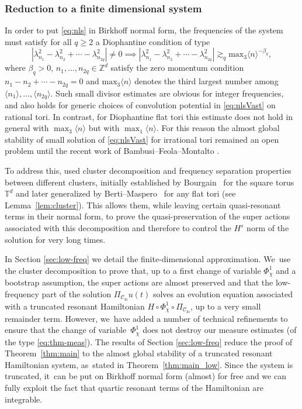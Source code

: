 \documentclass[10pt,a4paper]{amsart}
\theoremstyle{plain}
\theoremstyle{definition}
\DeclareMathOperator{\lo}{lo}
\newcommand{\T}{\mathbb{T}}
\newcommand{\1}{\mathbf{1}}
\newcommand{\Clo}{\mathscr{C}_{\lo}}
\begin{document}
\subsubsection{Reduction to a finite dimensional system}
\label{sub:resonant}

In order to put \eqref{eq:nls} in Birkhoff normal form, the frequencies of the system must satisfy for all $q\geq2$ a Diophantine condition of type
\[
|\lambda_{n_1}^2 -\lambda_{n_2}^2 + \cdots - \lambda_{n_{2q}}^2 | \neq 0 \implies |\lambda_{n_1}^2 -\lambda_{n_2}^2 + \cdots - \lambda_{n_{2q}}^2 | \gtrsim_{q} \mathrm{max}_{3} \langle n \rangle^{-\beta_q},
\]
where $\beta_q>0$, $n_1,\dots,n_{2q}\in \mathbb{Z}^d$ satisfy the zero momentum condition $n_1-n_2 + \cdots -n_{2q}=0$ and $\mathrm{max}_{3} \langle n \rangle$ denotes the third largest number among $\langle n_1 \rangle,\dots, \langle n_{2q} \rangle$. Such small divisor estimates are obvious for integer frequencies, and also holds for generic choices of convolution potential in \eqref{eq:nlsVast} on rational tori. In contrast, for Diophantine flat tori this estimate does not hold in general with $\max_{3}\langle n\rangle$ but with $\max_{1}\langle n\rangle$. For this reason the almost global stability of small solution of \eqref{eq:nlsVast} for irrational tori remained an open problem until the recent work of Bambusi--Feola--Montalto \cite{BFM22}.

To address this, \cite{BFM22} used cluster decomposition and frequency separation properties between different clusters, initially established by Bourgain~\cite{Bou98} for the square torus $\T^d$ and later generalized by Berti--Maspero~\cite{Berti-Maspero-19} for any flat tori (see Lemma~\ref{lem:cluster}). This allows them, while leaving certain quasi-resonant terms in their normal form, to prove the quasi-preservation of the super actions associated with this decomposition and therefore to control the $H^s$ norm of the solution for very long times.

In Section \ref{sec:low-freq} we detail the finite-dimensional approximation. We~use the cluster decomposition to prove that, up to a first change of variable $\Phi_\chi^1$ and a bootstrap assumption, the super actions are almost preserved and that the low-frequency part of the solution $\Pi_{\Clo} u(t) $ solves an evolution equation associated with a truncated resonant Hamiltonian $H \circ \Phi_\chi^1 \circ \Pi_{\Clo}$, up to a very small remainder term. However, we~have added a number of technical refinements to ensure that the change of variable~$\Phi_\chi^1$ does not destroy our measure estimates (of the type \eqref{eq:thm-meas}). The results of Section \ref{sec:low-freq} reduce the proof of Theorem~\ref{thm:main} to the almost global stability of a truncated resonant Hamiltonian system, as~stated in Theorem~\ref{thm:main_low}. Since the system is truncated, it~can be put on Birkhoff normal form
(almost) for free and we can fully exploit the fact that
quartic resonant terms of the Hamiltonian are integrable.
\end{document}
